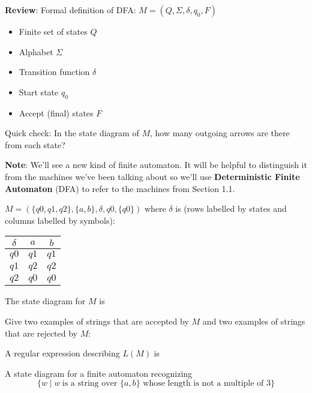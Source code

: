 \documentclass[12pt, oneside]{article}
\begin{document}
{\bf Review}: Formal definition of DFA: $M = (Q, \Sigma, \delta, q_0, F)$ 

\begin{center}
\begin{multicols}{2}
\begin{itemize}
\setlength{\itemsep}{2pt}
\item Finite set of states $Q$
\item Alphabet $\Sigma$
\item Transition function $\delta$
\item Start state $q_0$
\item Accept (final) states $F$
\end{itemize}
\end{multicols}
\end{center}
Quick check: In the state diagram of $M$, how many outgoing arrows are there from each state?



{\bf Note}: We'll see a new kind of finite automaton. It will be helpful to distinguish it from the
machines we've been talking about so we'll use {\bf Deterministic Finite Automaton} (DFA) to refer to the machines 
from Section 1.1.

$M = ( \{ q0, q1, q2\}, \{a,b\}, \delta, q0, \{q0\} )$ 
where $\delta$ is  (rows labelled by states
and columns labelled by symbols):
\begin{center}
\begin{tabular}{c|cc}
$\delta$ & $a$ & $b$ \\
\hline
$q0$ & $q1$ & $q1$ \\
$q1$ & $q2$ & $q2$ \\
$q2$ & $q0$ & $q0$ \\
\end{tabular}
\end{center}

The state diagram for $M$ is 

\vfill


Give two examples of strings that are accepted by $M$ and two examples of strings that are rejected by $M$:

\vfill


A regular expression describing $L(M)$ is


\vfill 

A state diagram for a finite automaton recognizing
$$\{w \mid w~\text{is a string over $\{a,b\}$ whose length is not a multiple of $3$} \}$$

\vfill
\end{document}
